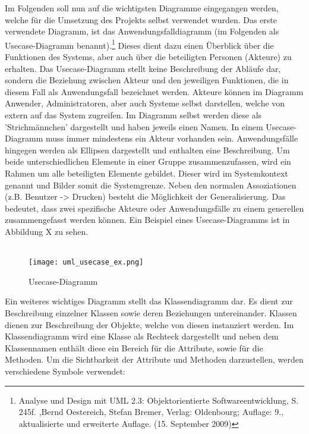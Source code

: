 Im Folgenden soll nun auf die wichtigsten Diagramme eingegangen werden, welche für die Umsetzung des Projekts selbst verwendet wurden.
Das erste verwendete Diagramm, ist das Anwendungsfalldiagramm (im Folgenden als Usecase-Diagramm benannt).\footnote{Analyse und Design mit UML 2.3: Objektorientierte Softwareentwicklung, S. 245f. ,Bernd Oestereich, Stefan Bremer, Verlag: Oldenbourg; Auflage: 9., aktualisierte und erweiterte Auflage. (15. September 2009)} 
Dieses dient dazu einen Überblick über die Funktionen des Systems, aber auch über die beteiligten Personen (Akteure) zu erhalten. Das Usecase-Diagramm stellt keine Beschreibung der Abläufe dar, sondern die Beziehung zwischen Akteur und den jeweiligen Funktionen, die in diesem Fall als Anwendungsfall bezeichnet werden. Akteure können im Diagramm Anwender, Administratoren, aber auch Systeme selbst darstellen, welche von extern auf das System zugreifen. Im Diagramm selbst werden diese als 'Strichmännchen' dargestellt und haben jeweils einen Namen. In einem Usecase-Diagramm muss immer mindestens ein Akteur vorhanden sein.
Anwendungsfälle hingegen werden als Ellipsen dargestellt und enthalten eine Beschreibung.
Um beide unterschiedlichen Elemente in einer Gruppe zusammenzufassen, wird ein Rahmen um alle beteiligten Elemente gebildet.
Dieser wird im Systemkontext genannt und Bilder somit die Systemgrenze.
Neben den normalen Assoziationen (z.B. Benutzer -> Drucken) besteht die Möglichkeit der Generalisierung.
Das bedeutet, dass zwei spezifische Akteure oder Anwendungsfälle zu einem generellen zusammengefasst werden können.
Ein Beispiel eines Usecase-Diagramms ist in Abbildung X zu sehen.\\
\\
\begin{figure}[H]
\centering
\texttt{[image: uml\_usecase\_ex.png]}
\caption{Usecase-Diagramm}
\label{fig:show_s1_s2_p1_n1}
\end{figure}
Ein weiteres wichtiges Diagramm stellt das Klassendiagramm dar. Es dient zur Beschreibung einzelner Klassen sowie deren Beziehungen untereinander. Klassen dienen zur Beschreibung der Objekte, welche von diesen instanziert werden. Im Klassendiagramm wird eine Klasse als Rechteck dargestellt und neben dem Klassennamen enthält diese ein Bereich für die Attribute, sowie für die Methoden.
Um die Sichtbarkeit der Attribute und Methoden darzustellen, werden verschiedene Symbole verwendet:\\

